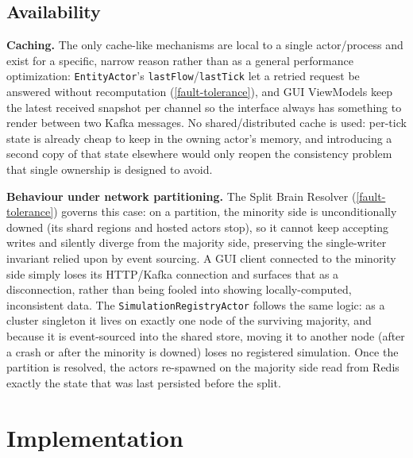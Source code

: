 \documentclass{scrreprt}
\begin{document}
\subsection{Availability}\label{availability}

\textbf{Caching.} The only cache-like mechanisms are local to a single actor/process and
exist for a specific, narrow reason rather than as a general performance optimization:
\texttt{EntityActor}'s \texttt{lastFlow}/\texttt{lastTick} let a retried request be answered
without recomputation (\cref{fault-tolerance}), and GUI ViewModels keep the latest received
snapshot per channel so the interface always has something to render between two Kafka
messages. No shared/distributed cache is used: per-tick state is already cheap
to keep in the owning actor's memory, and introducing a second copy of that state elsewhere
would only reopen the consistency problem that single ownership is designed to avoid.

\textbf{Behaviour under network partitioning.} The Split Brain Resolver
(\cref{fault-tolerance}) governs this case: on a partition, the minority side is
unconditionally downed (its shard regions and hosted actors stop), so it cannot keep accepting
writes and silently diverge from the majority side, preserving the single-writer invariant
relied upon by event sourcing. A GUI client connected to the minority side simply loses its
HTTP/Kafka connection and surfaces that as a disconnection, rather than being fooled into
showing locally-computed, inconsistent data. The \texttt{SimulationRegistryActor} follows the
same logic: as a cluster singleton it lives on exactly one node of the surviving majority, and
because it is event-sourced into the shared store, moving it to another node (after a crash or
after the minority is downed) loses no registered simulation. Once the partition is resolved,
the actors re-spawned on the majority side read from Redis exactly the state that was last
persisted before the split.

\section{Implementation}\label{implementation}
\end{document}
